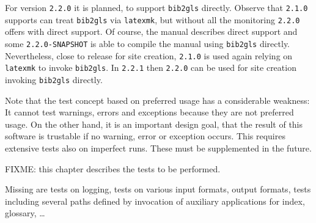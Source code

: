 \documentclass[a4paper,12pt,german,english]{book}
\begin{document}
For version \texttt{2.2.0} it is planned, to support \texttt{bib2gls} directly. 
Observe that \texttt{2.1.0} supports can treat \texttt{bib2gls} via \texttt{latexmk}, 
but without all the monitoring \texttt{2.2.0} offers with direct support. 
Of course, the manual describes direct support and 
some \texttt{2.2.0-SNAPSHOT} is able to compile the manual using \texttt{bib2gls} directly. 
Nevertheless, close to release for site creation, 
\texttt{2.1.0} is used again relying on \texttt{latexmk} to invoke \texttt{bib2gls}. 
In \texttt{2.2.1} then \texttt{2.2.0} can be used for site creation invoking \texttt{bib2gls} directly. 


Note that the test concept based on preferred usage has a considerable weakness: 
It cannot test warnings, errors and exceptions 
because they are not preferred usage. 
On the other hand, it is an important design goal, 
that the result of this software is trustable if no warning, error or exception occurs. 
This requires extensive tests also on imperfect runs. 
These must be supplemented in the future. 

FIXME\@: this chapter describes the tests to be performed. 

Missing are tests on logging, tests on various input formats, 
output formats, tests including several paths 
defined by invocation of auxiliary applications for index, glossary, \dots 






\end{document}
